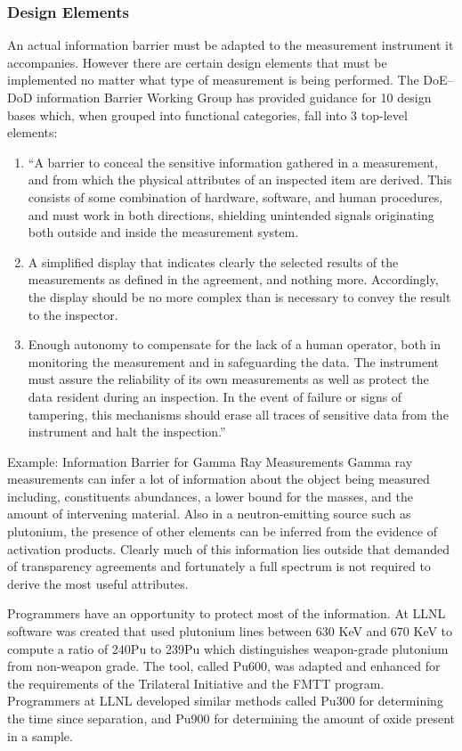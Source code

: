 \documentclass[twoside,titlepage,11pt,twocolumn,a4paper]{article}
\begin{document}
\subsubsection{Design Elements}
An actual information barrier must be adapted to the measurement
instrument it accompanies. However there are certain design elements
that must be implemented no matter what type of measurement is being
performed. The DoE--DoD information Barrier Working Group has provided
guidance for 10 design bases which, when grouped into functional
categories, fall into 3 top-level elements:
\begin{enumerate}
  \item ``A barrier to conceal the sensitive information gathered in a
    measurement, and from which the physical attributes of an
    inspected item are derived. This consists of some combination of
    hardware, software, and human procedures, and must work in both
    directions, shielding unintended signals originating both outside
    and inside the measurement system.
  \item A simplified display that indicates clearly the selected
    results of the measurements as defined in the agreement, and
    nothing more. Accordingly, the display should be no more complex
    than is necessary to convey the result to the inspector.
  \item Enough autonomy to compensate for the lack of a human
    operator, both in monitoring the measurement and in safeguarding
    the data. The instrument must assure the reliability of its own
    measurements as well as protect the data resident during an
    inspection. In the event of failure or signs of tampering, this
    mechanisms should erase all traces of sensitive data from the
    instrument and halt the inspection.'' \citep{depDoE1999}
\end{enumerate}

Example: Information
Barrier for Gamma Ray Measurements Gamma ray measurements can infer a
lot of information about the object being measured including,
constituents abundances, a lower bound for the masses, and the amount
of intervening material. Also in a neutron-emitting source such as
plutonium, the presence of other elements can be inferred from the
evidence of activation products. Clearly much of this information lies
outside that demanded of transparency agreements and fortunately a
full spectrum is not required to derive the most useful attributes.

Programmers have an opportunity to protect most of the information. At
LLNL software was created that used plutonium lines between 630 KeV
and 670 KeV to compute a ratio of 240Pu to 239Pu which distinguishes
weapon-grade plutonium from non-weapon grade. The tool, called Pu600,
was adapted and enhanced for the requirements of the Trilateral
Initiative and the FMTT program. Programmers at LLNL developed similar
methods called Pu300 for determining the time since separation, and
Pu900 for determining the amount of oxide present in a sample.
\end{document}
